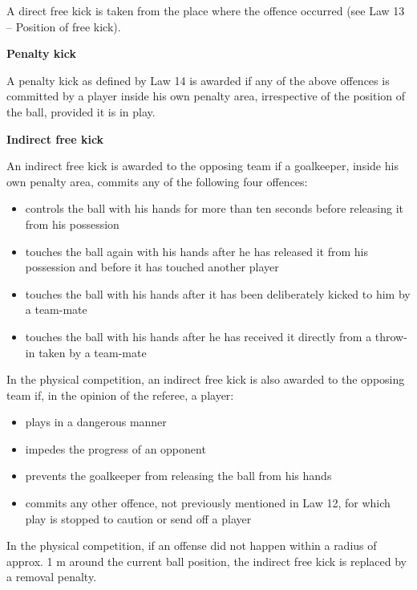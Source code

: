 A direct free kick is taken from the place where the offence occurred (see Law 13 -- Position of free kick).


\bigskip

{\bfseries Penalty kick}

\headlinebox

A penalty kick as defined by Law 14 is awarded if any of the above
offences is committed by a player inside his own penalty area,
irrespective of the position of the ball, provided it is in play.


\bigskip

{\bfseries Indirect free kick}

\headlinebox

An indirect free kick is awarded to the opposing team if a goalkeeper, inside his own penalty area, commits any of the following four offences: 

\begin{itemize}
\item controls the ball with his hands for more than ten seconds before releasing it from his possession
\item touches the ball again with his hands after he has released it from his possession and before it has touched another player
\item touches the ball with his hands after it has been deliberately kicked to him by a team-mate
\item touches the ball with his hands after he has received it directly from a throw-in taken by a team-mate
\end{itemize}

\bigskip

In the physical competition, an indirect free kick is also awarded to the opposing team if, in the opinion of the referee, a player:

\begin{itemize}
\item plays in a dangerous manner
\item impedes the progress of an opponent
\item prevents the goalkeeper from releasing the ball from his hands
\item commits any other offence, not previously mentioned in Law 12, for which play is stopped to caution or send off a player
\end{itemize}

\bigskip


In the physical competition, if an offense did not happen within a radius of approx. 1 m
around the current ball position, the indirect free kick is replaced by a
removal penalty.



